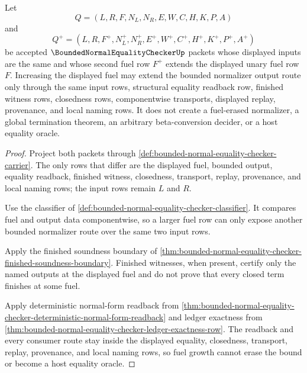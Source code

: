 \begin{theorem}
\label{thm:bounded-normal-equality-checker-fuel-monotonicity}
Let
$$
Q=(L,R,F,N_L,N_R,E,W,C,H,K,P,A)
$$
and
$$
Q^+=(L,R,F^+,N^+_L,N^+_R,E^+,W^+,C^+,H^+,K^+,P^+,A^+)
$$
be accepted $\BoundedNormalEqualityCheckerUp$ packets whose displayed inputs are the same and whose second fuel row $F^+$ extends the displayed unary fuel row $F$. Increasing the displayed fuel may extend the bounded normalizer output route only through the same input rows, structural equality readback row, finished witness rows, closedness rows, componentwise transports, displayed replay, provenance, and local naming rows. It does not create a fuel-erased normalizer, a global termination theorem, an arbitrary beta-conversion decider, or a host equality oracle.
\end{theorem}
\begin{proof}
Project both packets through \autoref{def:bounded-normal-equality-checker-carrier}. The only rows that differ are the displayed fuel, bounded output, equality readback, finished witness, closedness, transport, replay, provenance, and local naming rows; the input rows remain $L$ and $R$.

Use the classifier of \autoref{def:bounded-normal-equality-checker-classifier}. It compares fuel and output data componentwise, so a larger fuel row can only expose another bounded normalizer route over the same two input rows.

Apply the finished soundness boundary of \autoref{thm:bounded-normal-equality-checker-finished-soundness-boundary}. Finished witnesses, when present, certify only the named outputs at the displayed fuel and do not prove that every closed term finishes at some fuel.

Apply deterministic normal-form readback from \autoref{thm:bounded-normal-equality-checker-deterministic-normal-form-readback} and ledger exactness from \autoref{thm:bounded-normal-equality-checker-ledger-exactness-row}. The readback and every consumer route stay inside the displayed equality, closedness, transport, replay, provenance, and local naming rows, so fuel growth cannot erase the bound or become a host equality oracle.
\end{proof}

